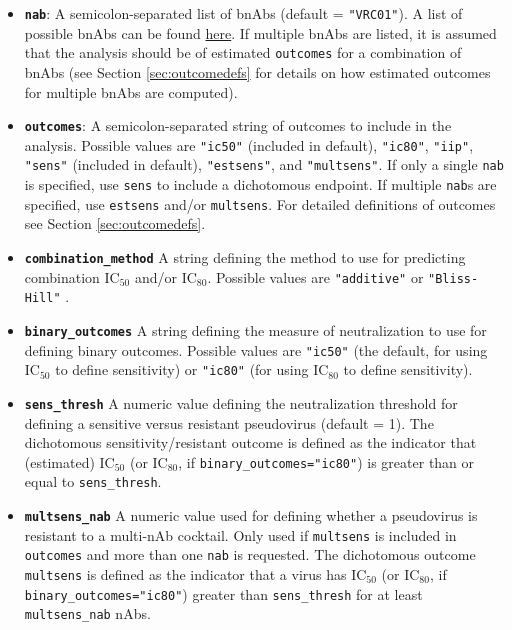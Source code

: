 \documentclass[
]{article}
\providecommand{\tightlist}{%
  \setlength{\itemsep}{0pt}\setlength{\parskip}{0pt}}
\begin{document}
\begin{itemize}
\tightlist
\item
  \textbf{\texttt{nab}}: A semicolon-separated list of bnAbs (default = \texttt{"VRC01"}). A list of possible bnAbs can be found \href{https://www.hiv.lanl.gov/components/sequence/HIV/neutralization/main.comp}{here}. If multiple bnAbs are listed, it is assumed that the analysis should be of estimated \texttt{outcomes} for a combination of bnAbs (see Section \ref{sec:outcomedefs} for details on how estimated outcomes for multiple bnAbs are computed).
\item
  \textbf{\texttt{outcomes}}: A semicolon-separated string of outcomes to include in the analysis. Possible values are \texttt{"ic50"} (included in default), \texttt{"ic80"}, \texttt{"iip"}, \texttt{"sens"} (included in default), \texttt{"estsens"}, and \texttt{"multsens"}. If only a single \texttt{nab} is specified, use \texttt{sens} to include a dichotomous endpoint. If multiple \texttt{nab}s are specified, use \texttt{estsens} and/or \texttt{multsens}. For detailed definitions of outcomes see Section \ref{sec:outcomedefs}.
\item
  \textbf{\texttt{combination\_method}} A string defining the method to use for predicting combination IC\(_{50}\) and/or IC\(_{80}\). Possible values are \texttt{"additive"} \citep[the default, for the additive model defined in][]{wagh2016optimal} or \texttt{"Bliss-Hill"} \citep[for the Bliss-Hill model defined in][]{wagh2016optimal}.
\item
  \textbf{\texttt{binary\_outcomes}} A string defining the measure of neutralization to use for defining binary outcomes. Possible values are \texttt{"ic50"} (the default, for using IC\(_{50}\) to define sensitivity) or \texttt{"ic80"} (for using IC\(_{80}\) to define sensitivity).
\item
  \textbf{\texttt{sens\_thresh}} A numeric value defining the neutralization threshold for defining a sensitive versus resistant pseudovirus (default = 1). The dichotomous sensitivity/resistant outcome is defined as the indicator that (estimated) IC\(_{50}\) (or IC\(_{80}\), if \texttt{binary\_outcomes="ic80"}) is greater than or equal to \texttt{sens\_thresh}.
\item
  \textbf{\texttt{multsens\_nab}} A numeric value used for defining whether a pseudovirus is resistant to a multi-nAb cocktail. Only used if \texttt{multsens} is included in \texttt{outcomes} and more than one \texttt{nab} is requested. The dichotomous outcome \texttt{multsens} is defined as the indicator that a virus has IC\(_{50}\) (or IC\(_{80}\), if \texttt{binary\_outcomes="ic80"}) greater than \texttt{sens\_thresh} for at least \texttt{multsens\_nab} nAbs.

\end{itemize}
\end{document}
